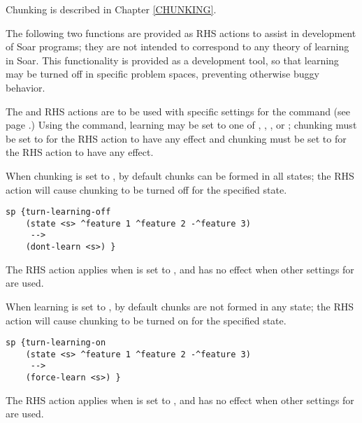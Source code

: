 Chunking is described in Chapter \ref{CHUNKING}.

The following two functions are provided as RHS actions to assist in
development of Soar programs; they are not intended to correspond to any
theory of learning in Soar. This functionality is provided as a development 
tool, so that learning may be turned off in specific problem spaces,
preventing otherwise buggy behavior.

The  and  RHS actions are to be used with
specific settings for the  command (see page \pageref{chunk}.)
Using the  command, learning may be set to one of ,
, , or ; chunking must be set to
 for the  RHS action to have any effect and
chunking must be set to  for the  RHS action
to have any effect.

\begin{description}
\item [\soarb{dont-learn} --- ] When chunking is set to ,
        by default chunks can be formed in all states; the 
        RHS action will cause chunking to be turned off for the specified
        state.

\begin{verbatim}
sp {turn-learning-off
    (state <s> ^feature 1 ^feature 2 -^feature 3)
     -->
    (dont-learn <s>) }
\end{verbatim}

        The  RHS action applies when  is 
	    set to , and has no effect when other settings for
         are used.


\item [\soarb{force-learn} --- ] When learning is set to ,
        by default chunks are not formed in any state; the 
        RHS action will cause chunking to be turned on for the specified
        state.

\begin{verbatim}
sp {turn-learning-on
    (state <s> ^feature 1 ^feature 2 -^feature 3)
     -->
    (force-learn <s>) }
\end{verbatim}

        The  RHS action applies when 
	    is set to , and has no effect when other settings for
         are used.

\end{description}
